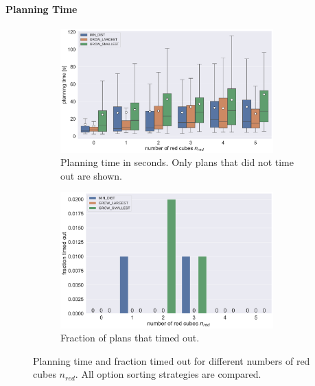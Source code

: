 \paragraph{Planning Time}

\begin{figure}
	\centering
	\begin{subfigure}[b]{\textwidth}
		\centering
		\includegraphics[width=0.9\textwidth]{figures/plots/AFNR_time.pdf}
		\caption{Planning time in seconds. Only plans that did not time out are shown.}
		\label{fig:AFNR_time}
	\end{subfigure}
	
	\begin{subfigure}[b]{\textwidth}
		\centering
		\includegraphics[width=0.9\textwidth]{figures/plots/AFNR_timeout.pdf}
		\caption{Fraction of plans that timed out.}
		\label{fig:AFNR_timeout}
	\end{subfigure}
	\caption[Planning time and fraction timed out for number of red cubes]{Planning time and fraction timed out for different numbers of red cubes $n_\textit{red}$. All option sorting strategies are compared.}
	\label{fig:AFNR_timestats}
\end{figure}


